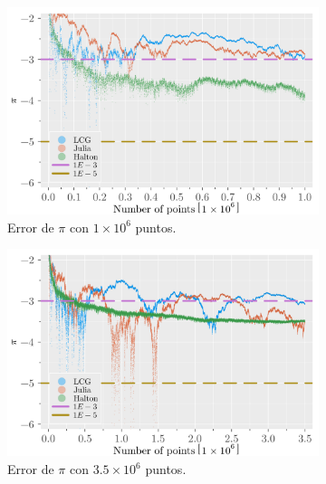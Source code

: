 \begin{enumerate}
\begin{solution}
        \clearpage
        \begin{figure}
            \centering
            \begin{subfigure}{0.45\textwidth}
                \centering
                \includegraphics[scale=0.065]{../figures/error_1E6.png}
                \caption{Error de $\pi$ con $1 \times 10^6$ puntos.}
                \label{fig:pi_error_1e6}
            \end{subfigure}
            \hfill
            \begin{subfigure}{0.45\textwidth}
                \centering
                \includegraphics[scale=0.065]{../figures/error_3dot5E6.png}
                \caption{Error de $\pi$ con $3.5 \times 10^6$ puntos.}
                \label{fig:pi_error_3.5e6}
            \end{subfigure}
            \begin{subfigure}{0.45\textwidth}

\end{subfigure}
\end{figure}
\end{solution}
\end{enumerate}
